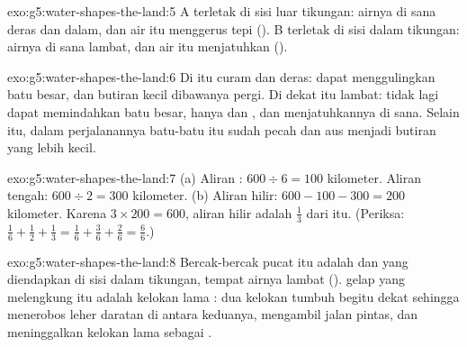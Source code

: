 \begin{solution}{exo:g5:water-shapes-the-land:5}
A terletak di sisi luar tikungan: airnya di sana deras dan dalam, dan air
itu menggerus tepi  (). B terletak di sisi dalam tikungan: airnya
di sana lambat, dan air itu menjatuhkan  ().
\end{solution}

\begin{solution}{exo:g5:water-shapes-the-land:6}
Di   itu curam dan deras:  dapat menggulingkan batu
besar, dan butiran kecil dibawanya pergi. Di dekat   itu lambat:
 tidak lagi dapat memindahkan batu besar, hanya  dan , dan
 menjatuhkannya di sana. Selain itu, dalam perjalanannya batu-batu
itu sudah pecah dan aus menjadi butiran yang lebih kecil.
\end{solution}

\begin{solution}{exo:g5:water-shapes-the-land:7}
(a) Aliran : $600 \div 6 = 100$ kilometer. Aliran tengah:
$600 \div 2 = 300$ kilometer. (b) Aliran hilir: $600 - 100 - 300 = 200$
kilometer. Karena $3 \times 200 = 600$, aliran hilir adalah $\frac{1}{3}$
dari  itu. (Periksa: $\frac{1}{6} + \frac{1}{2} + \frac{1}{3} = \frac{1}{6} +
\frac{3}{6} + \frac{2}{6} = \frac{6}{6}$.)
\end{solution}

\begin{solution}{exo:g5:water-shapes-the-land:8}
Bercak-bercak pucat itu adalah  dan  yang diendapkan di sisi
dalam tikungan, tempat airnya lambat ().  gelap yang
melengkung itu adalah kelokan lama : dua kelokan tumbuh begitu dekat
sehingga  menerobos leher daratan di antara keduanya, mengambil jalan
pintas, dan meninggalkan kelokan lama sebagai .
\end{solution}

